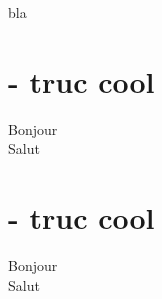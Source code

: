 \documentclass[12pt,a4paper]{nsiexo}
\begin{document}
\maketitle
bla
\section{- truc cool}
\question Bonjour\\
\question Salut
\resetquestion

\section{- truc cool}
\question Bonjour\\
\question Salut
\resetquestion
\end{document}
